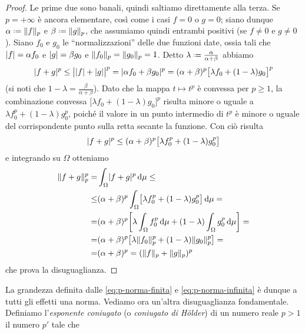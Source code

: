 \begin{proof}
    Le prime due sono banali, quindi saltiamo direttamente alla terza.
    Se $p=+\infty$ è ancora elementare, cos\`i come i casi $f=0$ o $g=0$; siano dunque $\alpha\defeq\norm{f}_p$ e $\beta\defeq\norm{g}_p$, che assumiamo quindi entrambi positivi (se $f\ne 0$ e $g\ne 0$).
    Siano $f_0$ e $g_0$ le ``normalizzazioni'' delle due funzioni date, ossia tali che $\abs{f}=\alpha f_0$ e $\abs{g}=\beta g_0$ e $\norm{f_0}_p=\norm{g_0}_p=1$.
    Detto $\lambda\defeq\frac{\alpha}{\alpha+\beta}$ abbiamo
    \begin{equation}
        \abs{f+g}^p\le
        \abs[\big]{\abs{f}+\abs{g}}^p=
        \abs{\alpha f_0+\beta g_0}^p=
        (\alpha+\beta)^p\bigl[\lambda f_0+(1-\lambda)g_0\bigr]^p
    \end{equation}
    (si noti che $1-\lambda=\frac{\beta}{\alpha+\beta}$).
    Dato che la mappa $t\mapsto t^p$ è convessa per $p\ge 1$, la combinazione convessa $\bigl[\lambda f_0+(1-\lambda)g_0\bigr]^p$ risulta minore o uguale a $\lambda f_0^p+(1-\lambda)g_0^p$, poich\'e il valore in un punto intermedio di $t^p$ è minore o uguale del corrispondente punto sulla retta secante la funzione.
    Con ciò risulta
    \begin{equation}
        \abs{f+g}^p\le
        (\alpha+\beta)^p\bigl[\lambda f_0^p+(1-\lambda)g_0^p\bigr]
    \end{equation}
    e integrando su $\Omega$ otteniamo
    \begin{equation}
        \begin{split}
            \norm{f+g}_p^p=&
            \int_\Omega \abs{f+g}^p\,\dd\mu\le\\\le&
            (\alpha+\beta)^p\int_\Omega\bigl[\lambda f_0^p+(1-\lambda)g_0^p\bigr]\,\dd\mu=\\=&
            (\alpha+\beta)^p\biggl[\lambda\int_\Omega f_0^p\,\dd\mu+(1-\lambda)\int_\Omega g_0^p\,\dd\mu\biggr]=\\=&
            (\alpha+\beta)^p\bigl[\lambda\norm{f_0}_p^p+(1-\lambda)\norm{g_0}_p^p\bigr]=\\=&
            (\alpha+\beta)^p=(\norm{f}_p+\norm{g}_p)^p
        \end{split}
    \end{equation}
    che prova la disuguaglianza.
\end{proof}
La grandezza definita dalle \eqref{eq:p-norma-finita} e \eqref{eq:p-norma-infinita} è dunque a tutti gli effetti una norma.
Vediamo ora un'altra disuguaglianza fondamentale.
Definiamo l'\emph{esponente coniugato} (o \emph{coniugato di H\"older}) di un numero reale $p>1$ il numero $p'$ tale che
